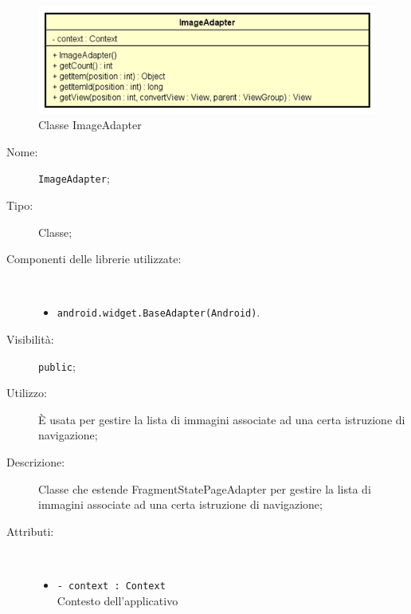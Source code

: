 \documentclass[../DefinizioneDiProdotto.tex]{subfiles}
\begin{document}
    \begin{figure}[H]
        \centering
        \includegraphics{img/ImageAdapter.png}
        \caption{Classe ImageAdapter}\label{fig:presenter::ImageAdapter} 
    \end{figure}
    \begin{description}
\item[Nome:] \texttt{ImageAdapter};
\item[Tipo:] Classe;
\item[Componenti delle librerie utilizzate:] \
\begin{itemize}
\item \texttt{android.widget.BaseAdapter(Android)}.

\end{itemize}
\item[Visibilità:] \texttt{public};
\item[Utilizzo:] È usata per gestire la lista di immagini associate ad una certa istruzione di navigazione;
\item[Descrizione:] Classe che estende FragmentStatePageAdapter per gestire la lista di immagini associate ad una certa istruzione di navigazione;
\item[Attributi:] \
\begin{itemize}
\item \texttt{- context : Context}\\
Contesto dell'applicativo


\end{itemize}
\end{description}
\end{document}
